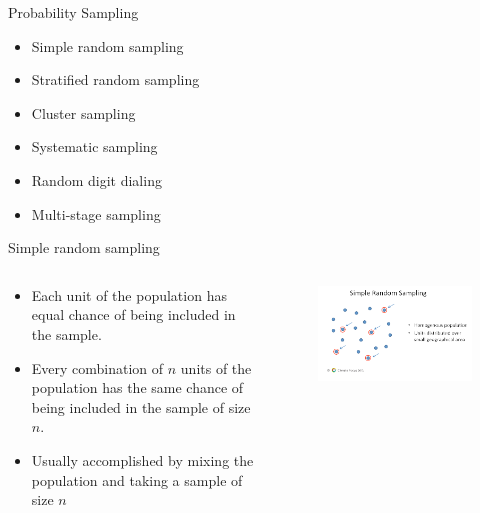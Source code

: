 \documentclass[10pt, compress]{beamer}
\begin{document}
\begin{frame}[t]{Probability Sampling}
    \begin{itemize}
        \item Simple random sampling
        \item Stratified random sampling
        \item Cluster sampling
        \item Systematic sampling
        \item Random digit dialing
        \item Multi-stage sampling
    \end{itemize}
\end{frame}

\begin{frame}[t]{Simple random sampling}
    \begin{columns}
        \begin{block}{}
            \begin{itemize}
                \item Each unit of the population has equal chance of being included in the sample.
                \item Every combination of $n$ units of the population has the same chance of being included in the sample of size $n$.
                \item Usually accomplished by mixing the population and taking a sample of size $n$
            \end{itemize}
        \end{block}
        \begin{block}{}
            \begin{figure}
                \begin{center}
                    \includegraphics[scale=0.25]{img/Slide2.png}
                \end{center}
            \end{figure}
        \end{block}
    \end{columns}
\end{frame}
\end{document}
